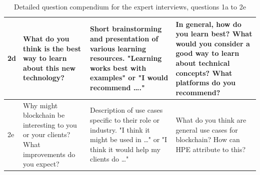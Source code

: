 \begin{table}[H]
\begin{tabular}{ | p{0.7cm} P{2.6cm} p{5cm} p{6cm}|}
	2d & What do you think is the best way to learn about this new technology?  & Short brainstorming and presentation of various learning resources. "Learning works best with examples" or "I would recommend …." & In general, how do you learn best? What would you consider a good way to learn about technical concepts? What platforms do you recommend?  \\ \hline
	2e & Why might blockchain be interesting to you or your clients? What improvements do you expect?  & Description of use cases specific to their role or industry. "I think it might be used in …" or "I think it would help my clients do …" & What do you think are general use cases for blockchain? How can HPE attribute to this? \\\hline
    \end{tabular}
    \caption{Detailed question compendium for the expert interviews, questions 1a to 2e}
    \label{tab:my_label}
\end{table}

